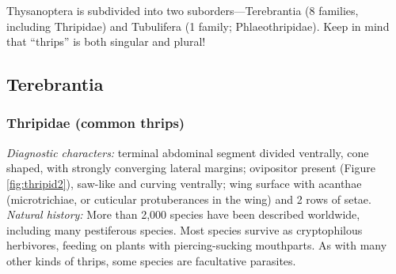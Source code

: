 \documentclass[letterpaper, 11pt]{article}
\begin{document}
\noindent{}Thysanoptera is subdivided into two suborders---Terebrantia (8 families, including Thripidae) and Tubulifera (1 family; Phlaeothripidae). Keep in mind that ``thrips'' is both singular and plural!

\subsection{Terebrantia}
\subsubsection{Thripidae (common thrips)}
\noindent{}\textit{Diagnostic characters:} terminal abdominal segment divided ventrally, cone shaped, with strongly converging lateral margins; ovipositor present (Figure \ref{fig:thripid2}), saw-like and curving ventrally; wing surface with acanthae (microtrichiae, or cuticular protuberances in the wing) and 2 rows of setae. \\

\noindent{}\textit{Natural history:} More than 2,000 species have been described worldwide, including many pestiferous species. Most species survive as cryptophilous herbivores, feeding on plants with piercing-sucking mouthparts. As with many other kinds of thrips, some species are facultative parasites.\\
\end{document}
